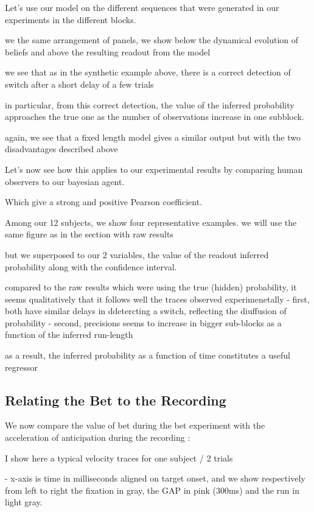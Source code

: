 \documentclass[profile,final,english, draft]{article}%
\begin{document}
 Let's use our model on the different sequences that were generated in our experiments in the different blocks.

we the same arrangement of panels, we show below the dynamical evolution of beliefs and above the resulting readout from the model

we see that as in the synthetic example above, there is a correct detection of switch after a short delay of a few trials

in particular, from this correct detection, the value of the inferred probability approaches the true one as the number of observations increase in one subblock.

again, we see that a fixed length model gives a similar output but with the two disadvantages described above

Let's now see how this applies to our experimental results by comparing human observers to our bayesian agent.

Which give a strong and positive Pearson coefficient.



Among our 12 subjects, we show four representative examples. we will use the same figure as in the section with raw results

but we superposed to our 2 variables, the value of the readout inferred probability along with the confidence interval.

compared to the raw results which were using the true (hidden) probability, it seems qualitatively that it follows well the traces observed experimenetally
- first, both have similar delays in ddetercting a switch, reflecting the diuffusion of probability
- second, precisions seems to increase in bigger sub-blocks as a function of the inferred run-length

as a result, the inferred probability as a function of time constitutes a useful regressor


\subsection{Relating the Bet to the Recording}

We now compare the value of bet during the bet experiment with the acceleration of anticipation during the recording :



I show here a typical velocity traces for one subject / 2 trials

- x-axis is time in milliseconds aligned on target onset, and we show respectively from left to right the fixation in gray, the GAP in pink (300ms) and the run in light gray.
\end{document}
